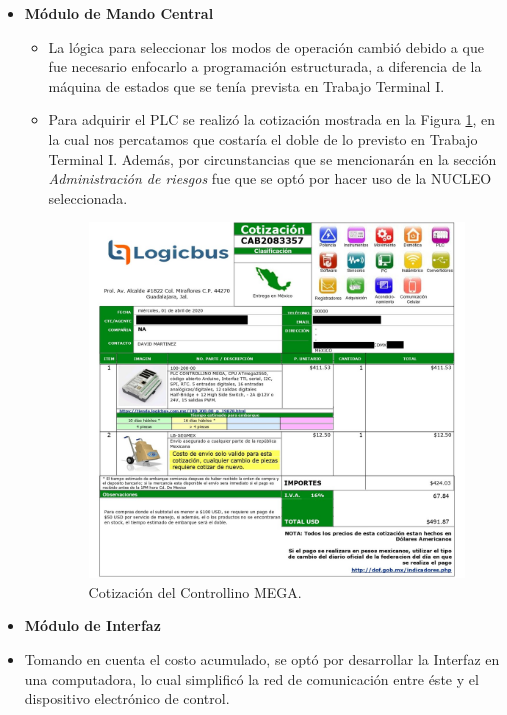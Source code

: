 \begin{itemize}
\begin{itemize}
        
    \end{itemize}
    \item \textbf{Módulo de Mando Central}\\
    \begin{itemize}
        \item La lógica para seleccionar los modos de operación cambió debido a que fue necesario enfocarlo a programación estructurada, a diferencia de la máquina de estados que se tenía prevista en Trabajo Terminal I.
        \item Para adquirir el PLC se realizó la cotización mostrada en la Figura \ref{fig:plc_cotizacion}, en la cual nos percatamos que costaría el doble de lo previsto en Trabajo Terminal I. Además, por circunstancias que se mencionarán en la sección \textit{Administración de riesgos} fue que se optó por hacer uso de la NUCLEO seleccionada.
        \begin{figure}[H]
        	\centering
        	\includegraphics[width=12cm]{imagenes/plc_cotizacion}
        	\caption{Cotización del Controllino MEGA.}
        	\label{fig:plc_cotizacion}
        \end{figure}
    \end{itemize}
    \item \textbf{Módulo de Interfaz}\\
    \item Tomando en cuenta el costo acumulado, se optó por desarrollar la Interfaz en una computadora, lo cual simplificó la red de comunicación entre éste y el dispositivo electrónico de control.
\end{itemize}

